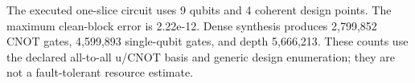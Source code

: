 The executed one-slice circuit uses 9 qubits and 4 coherent design points. The maximum clean-block error is 2.22e-12. Dense synthesis produces 2,799,852 CNOT gates, 4,599,893 single-qubit gates, and depth 5,666,213. These counts use the declared all-to-all u/CNOT basis and generic design enumeration; they are not a fault-tolerant resource estimate.
